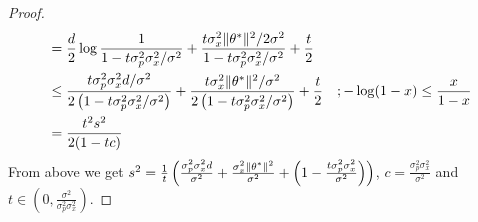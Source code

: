 \begin{proof}
\begin{align*}
    &= \frac{d}{2}\log \frac{1}{1-t\sigma^2_p \sigma_x^2/\sigma^2} + \frac{t \sigma_x^2 \|\theta^*\|^2/2\sigma^2}{1-t\sigma_p^2 \sigma_x^2/\sigma^2} + \frac{t}{2} \\
    &\leq \frac{t\sigma^2_p \sigma_x^2d/\sigma^2}{2\left( 1-t\sigma^2_p \sigma_x^2/\sigma^2\right)} + \frac{t \sigma_x^2 \|\theta^*\|^2/\sigma^2}{2 \left( 1-t\sigma_p^2 \sigma_x^2/\sigma^2 \right)} + \frac{t}{2} \quad ; -\log (1-x) \leq \frac{x}{1-x} \\
    &= \frac{t^2s^2}{2(1-tc)}
\end{align*}
From above we get $s^2 = \frac{1}{t} \left( \frac{\sigma^2_p \sigma_x^2d}{\sigma^2} + \frac{\sigma_x^2 \|\theta^*\|^2}{\sigma^2} + \left( 1-\frac{t\sigma^2_p \sigma_x^2}{\sigma^2}\right) \right) $, $c=\frac{\sigma^2_p \sigma_x^2}{\sigma^2}$ and $t \in (0,\frac{\sigma^2}{\sigma^2_p \sigma_x^2})$.
\end{proof}

